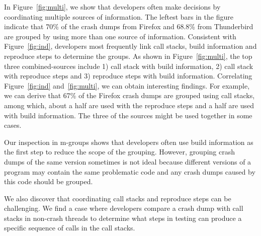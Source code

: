 
In Figure~\ref{fig:multi}, we show that developers often make decisions by coordinating multiple sources of information. The leftest bars in the figure indicate that 70\% of the crash dumps from Firefox and 68.8\% from Thunderbird are grouped by using more than one source of information. Consistent with Figure~\ref{fig:ind}, developers most frequently link call stacks, build information and reproduce steps to determine the groups. As shown in Figure~\ref{fig:multi}, the top three combined-sources include 1) call stack with build information, 2) call stack with reproduce steps and 3) reproduce steps with build information. Correlating Figure~\ref{fig:ind} and~\ref{fig:multi}, we can obtain interesting findings. For example, we can derive that 67\% of the Firefox crash dumps are grouped using call stacks, among which, about a half are used with the reproduce steps and a half are used with build information. The three of the sources might be used together in some cases. 

Our inspection in m-groups shows that developers often use build information as the first step to reduce the scope of the grouping. However, grouping crash dumps of the same version sometimes is not ideal because different versions of a program may contain the same problematic code and any crash dumps caused by this code should be grouped. 

We also discover that coordinating call stacks and reproduce steps can be challenging. We find a case where developers compare a crash dump with call stacks in non-crash threads to determine what steps in testing can produce a specific sequence of calls in the call stacks.


